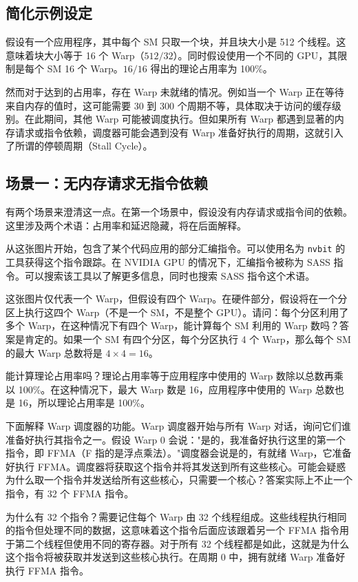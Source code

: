 \subsection{简化示例设定}

假设有一个应用程序，其中每个 SM 只取一个块，并且块大小是 512 个线程。这意味着块大小等于 16 个 Warp（$512/32$）。同时假设使用一个不同的 GPU，其限制是每个 SM 16 个 Warp。$16/16$ 得出的理论占用率为 100\%。

然而对于达到的占用率，存在 Warp 未就绪的情况。例如当一个 Warp 正在等待来自内存的值时，这可能需要 30 到 300 个周期不等，具体取决于访问的缓存级别。在此期间，其他 Warp 可能被调度执行。但如果所有 Warp 都遇到显著的内存请求或指令依赖，调度器可能会遇到没有 Warp 准备好执行的周期，这就引入了所谓的停顿周期（Stall Cycle）。

\subsection{场景一：无内存请求无指令依赖}

有两个场景来澄清这一点。在第一个场景中，假设没有内存请求或指令间的依赖。这里涉及两个术语：占用率和延迟隐藏，将在后面解释。

从这张图片开始，包含了某个代码应用的部分汇编指令。可以使用名为 \texttt{nvbit} 的工具获得这个指令跟踪。在 NVIDIA GPU 的情况下，汇编指令被称为 SASS 指令。可以搜索该工具以了解更多信息，同时也搜索 SASS 指令这个术语。

这张图片仅代表一个 Warp，但假设有四个 Warp。在硬件部分，假设将在一个分区上执行这四个 Warp（不是一个 SM，不是整个 GPU）。请问：每个分区利用了多个 Warp，在这种情况下有四个 Warp，能计算每个 SM 利用的 Warp 数吗？答案是肯定的。如果一个 SM 有四个分区，每个分区执行 4 个 Warp，那么每个 SM 的最大 Warp 总数将是 $4 \times 4 = 16$。

能计算理论占用率吗？理论占用率等于应用程序中使用的 Warp 数除以总数再乘以 100\%。在这种情况下，最大 Warp 数是 16，应用程序中使用的 Warp 总数也是 16，所以理论占用率是 100\%。

下面解释 Warp 调度器的功能。Warp 调度器开始与所有 Warp 对话，询问它们谁准备好执行其指令之一。假设 Warp 0 会说："是的，我准备好执行这里的第一个指令，即 FFMA（F 指的是浮点乘法）。"调度器会说是的，有就绪 Warp，它准备好执行 FFMA。调度器将获取这个指令并将其发送到所有这些核心。可能会疑惑为什么取一个指令并发送给所有这些核心，只需要一个核心？答案实际上不止一个指令，有 32 个 FFMA 指令。

为什么有 32 个指令？需要记住每个 Warp 由 32 个线程组成。这些线程执行相同的指令但处理不同的数据，这意味着这个指令后面应该跟着另一个 FFMA 指令用于第二个线程但使用不同的寄存器。对于所有 32 个线程都是如此，这就是为什么这个指令将被获取并发送到这些核心执行。在周期 0 中，拥有就绪 Warp 准备好执行 FFMA 指令。

